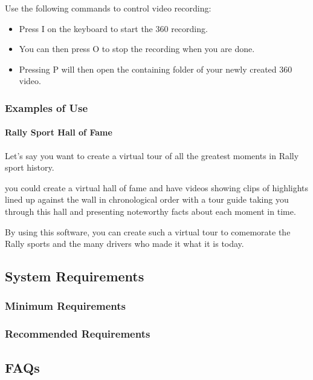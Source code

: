 			Use the following commands to control video recording:
			
			\begin{itemize}
				
				\item Press I on the keyboard to start the 360 recording.  
				
				\item You can then press O to stop the recording when you are done.  
				
				\item Pressing P will then open the containing folder of your newly created 360 video.  
				
			\end{itemize}
			
			
		\subsubsection{Examples of Use}
		
			\paragraph{Rally Sport Hall of Fame}
				
				Let's say you want to create a virtual tour of all the greatest moments in Rally sport history.  
				
				you could create a virtual hall of fame and have videos showing clips of highlights lined up against the wall in chronological order with a tour guide taking you through this hall and presenting noteworthy facts about each moment in time.  
				
				By using this software, you can create such a virtual tour to comemorate the Rally sports and the many drivers who made it what it is today.  
				
			
	
	\subsection{System Requirements}
		
		\subsubsection{Minimum Requirements}
		
		\subsubsection{Recommended Requirements}
	
	\subsection{FAQs}